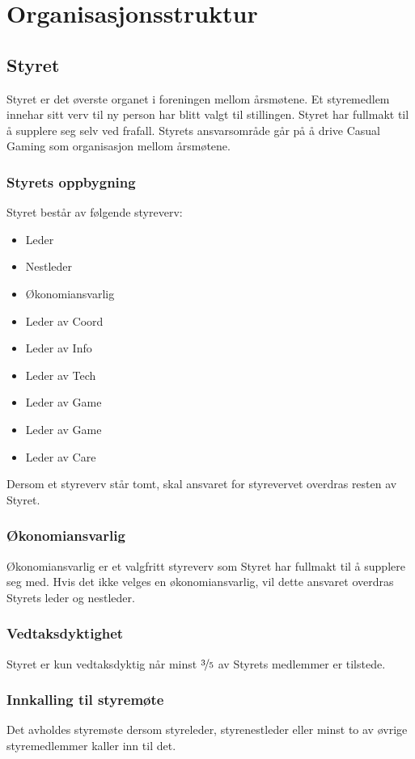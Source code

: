 \chapter{Organisasjonsstruktur}

\section{Styret}
Styret er det øverste organet i foreningen mellom årsmøtene. Et styremedlem innehar sitt verv til ny person har blitt valgt til stillingen. Styret har fullmakt til å supplere seg selv ved frafall. Styrets ansvarsområde går på å drive Casual Gaming som organisasjon mellom årsmøtene.

\subsection{Styrets oppbygning}
Styret består av følgende styreverv:
\begin{itemize}
    \item Leder
    \item Nestleder
    \item Økonomiansvarlig
    \item Leder av Coord
    \item Leder av Info
    \item Leder av Tech
    \item Leder av Game
    \item Leder av Game
    \item Leder av Care
\end{itemize}

Dersom et styreverv står tomt, skal ansvaret for styrevervet overdras resten av Styret.

\subsection{Økonomiansvarlig}
Økonomiansvarlig er et valgfritt styreverv som Styret har fullmakt til å supplere seg med. Hvis det ikke velges en økonomiansvarlig, vil dette ansvaret overdras Styrets leder og nestleder.

\subsection{Vedtaksdyktighet}
Styret er kun vedtaksdyktig når minst $\nicefrac{3}{5}$ av Styrets medlemmer er tilstede.

\subsection{Innkalling til styremøte}
Det avholdes styremøte dersom styreleder, styrenestleder eller minst to av øvrige styremedlemmer kaller inn til det.

